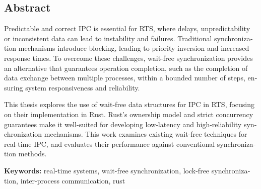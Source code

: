 \begin{otherlanguage}{english}
\chapter*{Abstract}


Predictable and correct \ac{IPC} is essential for \ac{RTS}, where delays, unpredictability or inconsistent data can lead to instability and failures. Traditional synchronization mechanisms introduce blocking, leading to priority inversion and increased response times. To overcome these challenges, wait-free synchronization provides an alternative that guarantees operation completion, such as the completion of data exchange between multiple processes, within a bounded number of steps, ensuring system responsiveness and reliability.

This thesis explores the use of wait-free data structures for \ac{IPC} in \ac{RTS}, focusing on their implementation in Rust. Rust’s ownership model and strict concurrency guarantees make it well-suited for developing low-latency and high-reliability synchronization mechanisms. This work examines existing wait-free techniques for real-time \ac{IPC}, and evaluates their performance against conventional synchronization methods.

\vfill
\noindent\textbf{Keywords:} real-time systems, wait-free synchronization, lock-free synchronization, inter-process communication, rust
\vfill
\end{otherlanguage}
